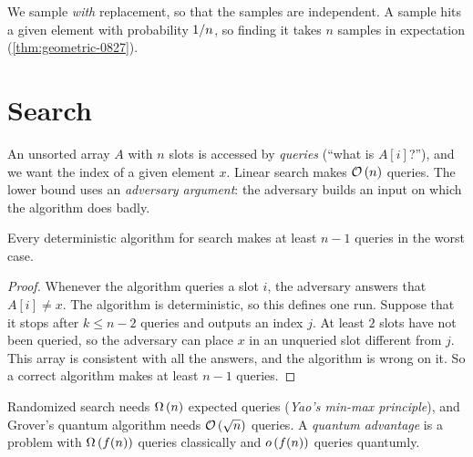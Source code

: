We sample \emph{with} replacement, so that the samples are independent. A sample hits a given
element with probability $1/n$, so finding it takes $n$ samples in expectation
(\cref{thm:geometric-0827}).

\section{Search}

An unsorted array $A$ with $n$ slots is accessed by \emph{queries} (``what is $A[i]$?''), and we
want the index of a given element $x$. Linear search makes $\mathcal{O}\left(n\right)$ queries. The lower bound uses
an \emph{adversary argument}: the adversary builds an input on which the algorithm does badly.

\begin{theorem}\label{thm:detsearch-0825}
    Every deterministic algorithm for search makes at least $n - 1$ queries in the worst case.
\end{theorem}

\begin{proof}
    Whenever the algorithm queries a slot $i$, the adversary answers that $A[i] \neq x$. The algorithm
    is deterministic, so this defines one run. Suppose that it stops after $k \leq n - 2$ queries and
    outputs an index $j$. At least $2$ slots have not been queried, so the adversary can place $x$ in
    an unqueried slot different from $j$. This array is consistent with all the answers, and the
    algorithm is wrong on it. So a correct algorithm makes at least $n - 1$ queries.
\end{proof}

Randomized search needs $\Omega\left(n\right)$ expected queries (\emph{Yao's min-max principle}), and Grover's
quantum algorithm needs $\mathcal{O}\left(\sqrt{n}\right)$ queries. A \emph{quantum advantage} is a problem with
$\Omega\left(f(n)\right)$ queries classically and $o\left(f(n)\right)$ queries quantumly.

